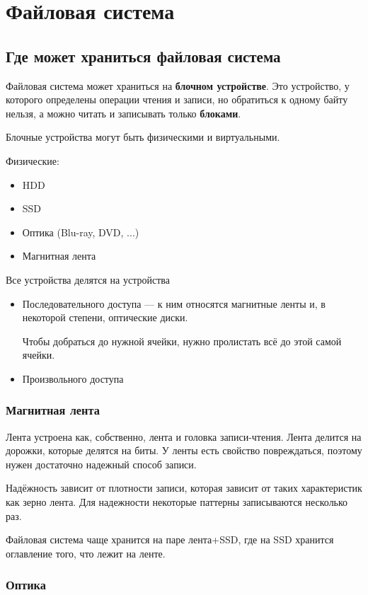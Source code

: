 \section{Файловая система}

\subsection{Где может храниться файловая система}

Файловая система может храниться на \textbf{блочном устройстве}. Это устройство, у которого определены операции чтения и записи, но обратиться к одному байту нельзя, а можно читать и записывать только \textbf{блоками}.

Блочные устройства могут быть физическими и виртуальными. 

Физические:
\begin{itemize}
\item HDD
\item SSD
\item Оптика (Blu-ray, DVD, ...)
\item Магнитная лента
\end{itemize}

Все устройства делятся на устройства
\begin{itemize}
\item Последовательного доступа --- к ним относятся магнитные ленты и, в некоторой степени, оптические диски.

Чтобы добраться до нужной ячейки, нужно пролистать всё до этой самой ячейки.
\item Произвольного доступа
\end{itemize}

\subsubsection{Магнитная лента}

Лента устроена как, собственно, лента и головка записи-чтения. Лента делится на дорожки, которые делятся на биты. У ленты есть свойство повреждаться, поэтому нужен достаточно надежный способ записи.

Надёжность зависит от плотности записи, которая зависит от таких характеристик как зерно лента. Для надежности некоторые паттерны записываются несколько раз.

Файловая система чаще хранится на паре лента+SSD, где на SSD хранится оглавление того, что лежит на ленте.

\subsubsection{Оптика}

